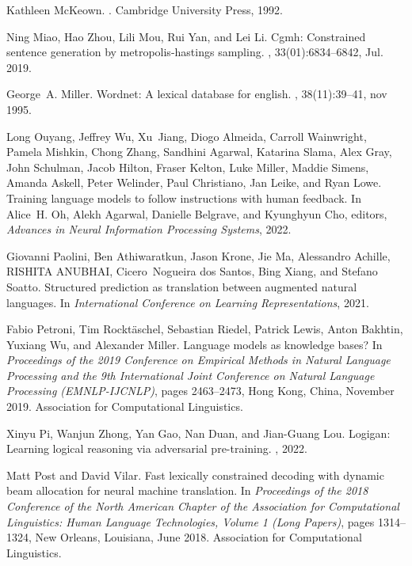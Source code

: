 \documentclass[11pt]{article}
\begin{document}
\begin{thebibliography}{100}
Kathleen McKeown.
.
\newblock Cambridge University Press, 1992.

Ning Miao, Hao Zhou, Lili Mou, Rui Yan, and Lei Li.
\newblock Cgmh: Constrained sentence generation by metropolis-hastings
  sampling.
,
  33(01):6834--6842, Jul. 2019.

George~A. Miller.
\newblock Wordnet: A lexical database for english.
, 38(11):39–41, nov 1995.

Long Ouyang, Jeffrey Wu, Xu~Jiang, Diogo Almeida, Carroll Wainwright, Pamela
  Mishkin, Chong Zhang, Sandhini Agarwal, Katarina Slama, Alex Gray, John
  Schulman, Jacob Hilton, Fraser Kelton, Luke Miller, Maddie Simens, Amanda
  Askell, Peter Welinder, Paul Christiano, Jan Leike, and Ryan Lowe.
\newblock Training language models to follow instructions with human feedback.
\newblock In Alice~H. Oh, Alekh Agarwal, Danielle Belgrave, and Kyunghyun Cho,
  editors, {\em Advances in Neural Information Processing Systems}, 2022.

Giovanni Paolini, Ben Athiwaratkun, Jason Krone, Jie Ma, Alessandro Achille,
  RISHITA ANUBHAI, Cicero~Nogueira dos Santos, Bing Xiang, and Stefano Soatto.
\newblock Structured prediction as translation between augmented natural
  languages.
\newblock In {\em International Conference on Learning Representations}, 2021.

Fabio Petroni, Tim Rockt{\"a}schel, Sebastian Riedel, Patrick Lewis, Anton
  Bakhtin, Yuxiang Wu, and Alexander Miller.
\newblock Language models as knowledge bases?
\newblock In {\em Proceedings of the 2019 Conference on Empirical Methods in
  Natural Language Processing and the 9th International Joint Conference on
  Natural Language Processing (EMNLP-IJCNLP)}, pages 2463--2473, Hong Kong,
  China, November 2019. Association for Computational Linguistics.

Xinyu Pi, Wanjun Zhong, Yan Gao, Nan Duan, and Jian-Guang Lou.
\newblock Logigan: Learning logical reasoning via adversarial pre-training.
, 2022.

Matt Post and David Vilar.
\newblock Fast lexically constrained decoding with dynamic beam allocation for
  neural machine translation.
\newblock In {\em Proceedings of the 2018 Conference of the North {A}merican
  Chapter of the Association for Computational Linguistics: Human Language
  Technologies, Volume 1 (Long Papers)}, pages 1314--1324, New Orleans,
  Louisiana, June 2018. Association for Computational Linguistics.


\end{thebibliography}
\end{document}
